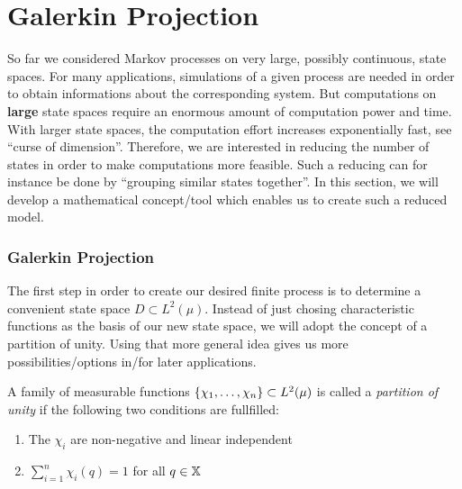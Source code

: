 \section{Galerkin Projection}
\label{sec:galerkin}

So far we considered Markov processes on very large, possibly continuous, state spaces.
For many applications, simulations of a given process are needed in order to obtain informations about the corresponding system. But computations on \textbf{large} state spaces require an enormous amount of computation power and time. With larger state spaces, the computation effort increases exponentially fast, see ``curse of dimension''. 
Therefore, we are interested in reducing the number of states in order to make computations more feasible.
Such a reducing can for instance be done by ``grouping similar states together''. In this section, we will develop a mathematical concept/tool which enables us to create such a reduced model.


\subsubsection*{Galerkin Projection}
The first step in order to create our desired finite process is to determine a convenient state space $D \subset L^2(\mu)$.
Instead of just chosing characteristic functions as the basis of our new state space, we will adopt the concept of a partition of unity. 
Using that more general idea gives us more possibilities/options in/for later applications.

\begin{defi}
A family of measurable functions $\{ \chi_1,\dots,\chi_n \} \subset L^2(\mu)$  is called a \textit{partition of unity} if the following two conditions are fullfilled:
\begin{enumerate}
\item The $\chi_i$ are non-negative and  linear independent
\item $\sum_{i=1}^n \chi_i(q) = 1$ for all $q \in \mathbb{X}$ 
\end{enumerate}
\end{defi}


